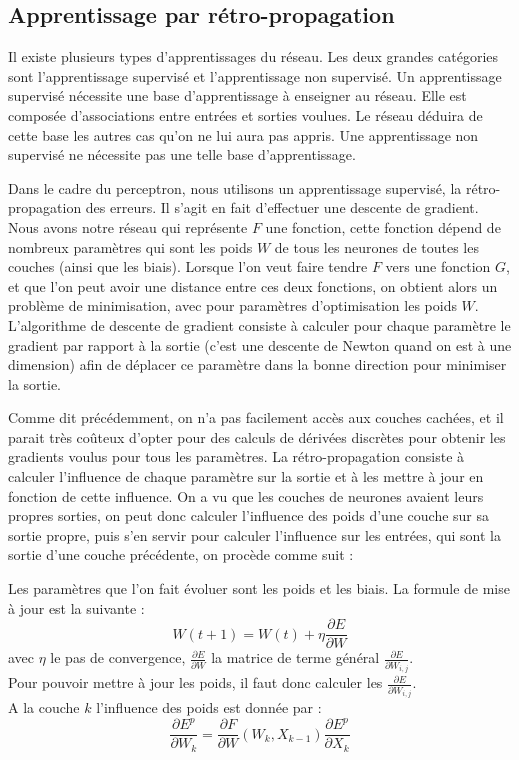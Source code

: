 
\subsection{Apprentissage par rétro-propagation}

Il existe plusieurs types d'apprentissages du réseau. Les deux grandes catégories sont l'apprentissage supervisé et l'apprentissage non supervisé. 
Un apprentissage supervisé nécessite une base d'apprentissage à enseigner au réseau. Elle est composée d'associations entre entrées et sorties voulues. Le réseau déduira de cette base les autres cas qu'on ne lui aura pas appris. Une apprentissage non supervisé ne nécessite pas une telle base d'apprentissage.

Dans le cadre du perceptron, nous utilisons un apprentissage supervisé, la rétro-propagation des erreurs. Il s'agit en fait d'effectuer une descente de gradient. Nous avons notre réseau qui représente $F$ une fonction, cette fonction dépend de nombreux paramètres qui sont les poids $W$ de tous les neurones de toutes les couches (ainsi que les biais). Lorsque l'on veut faire tendre $F$ vers une fonction $G$, et que l'on peut avoir une distance entre ces deux fonctions, on obtient alors un problème de minimisation, avec pour paramètres d'optimisation les poids $W$. L'algorithme de descente de gradient consiste à calculer pour chaque paramètre le gradient par rapport à la sortie (c'est une descente de Newton quand on est à une dimension) afin de déplacer ce paramètre dans la bonne direction pour minimiser la sortie.

Comme dit précédemment, on n'a pas facilement accès aux couches cachées, et il parait très coûteux d'opter pour des calculs de dérivées discrètes pour obtenir les gradients voulus pour tous les paramètres.
La rétro-propagation consiste à calculer l’influence de chaque paramètre sur la sortie et à les mettre à jour en fonction de cette influence. On a vu que les couches de neurones avaient leurs propres sorties, on peut donc calculer l'influence des poids d'une couche sur sa sortie propre, puis s'en servir pour calculer l'influence sur les entrées, qui sont la sortie d'une couche précédente, on procède comme suit : 

Les paramètres que l’on fait évoluer sont les poids et les biais.
La formule de mise à jour est la suivante :
\[
W(t+1) = W(t) + \eta \frac{\partial E}{\partial W} 
\]
avec $\eta$ le pas de convergence, $\frac{\partial E}{\partial W} $ la matrice de terme général $\frac{\partial E}{\partial W_{i,j}} $.\\
Pour pouvoir mettre à jour les poids, il faut donc calculer les $\frac{\partial E}{\partial W_{i,j}} $.\\
A la couche $k$ l'influence des poids est donnée par : 
\[
	\frac{\partial E^p}{\partial W _k} = \frac{\partial F}{\partial W}(W_k, X_{k-1})\frac{\partial E^p}{\partial X_k}
\]

